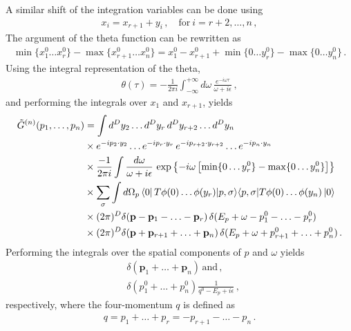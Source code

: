 \documentclass[notes]{subfiles}
\begin{document}
A similar shift of the integration variables can be done using
\begin{align}
  x_i = x_{r+1} + y_i\, , \quad \mathrm{for}\ i=r+2, \ldots, n\, ,
\end{align}
The argument of the theta function can be rewritten as
\begin{align}
  \min\{x_1^0 \ldots x_r^0\} - \max\{x_{r+1}^0 \ldots x_n^0\} = 
  x_1^0 -x_{r+1}^0 + \min\{0 \ldots y_r^0\} - \max\{0 \ldots y_n^0\}\, .
\end{align}
Using the integral representation of the theta,
\begin{align}
  \theta(\tau) = -\frac{1}{2\pi i} \int_{-\infty}^{+\infty} d\omega\,
  \frac{e^{-i\omega \tau}}{\omega + i\epsilon}\, ,
\end{align}
and performing the integrals over $x_1$ and $x_{r+1}$, yields
\begin{align}
  \tilde{G}^{(n)}(p_1, \ldots, p_n) 
  &= \int d^Dy_2 \ldots d^Dy_r\, d^Dy_{r+2} \ldots d^Dy_n \, \nonumber
  \\
  & \times e^{-ip_2\cdot y_2} \ldots e^{-ip_{r}\cdot y_r} 
    \, e^{-ip_{r+2}\cdot y_{r+2}} \ldots e^{-ip_{n}\cdot y_n}
    \nonumber \\
  & \times \frac{-1}{2\pi i} \int \frac{d\omega}{\omega + i\epsilon}\, 
    \exp\left\{
    -i \omega \left[ 
    \min\{0 \ldots y_r^0\} - \max\{0 \ldots y_n^0\}
    \right]
    \right\} \nonumber \\
  & \times \sum_\sigma \int d\Omega_p
    \bra{0}  T \phi(0) \ldots \phi(y_r) |
    p,\sigma\rangle \langle p, \sigma | T \phi(0) \ldots \phi(y_n)
    \ket{0} \nonumber \\
  & \times (2\pi)^D \delta(\mathbf{p} - \mathbf{p}_1 - \ldots -
    \mathbf{p}_r) \, 
    \delta(E_p + \omega - p_1^0 - \ldots - p_{r}^0) \nonumber \\
  & \times (2\pi)^D \delta(\mathbf{p} + \mathbf{p}_{r+1} + \ldots +
    \mathbf{p}_n) \, 
    \delta(E_p + \omega + p_{r+1}^0 + \ldots + p_{n}^0) \, .
\end{align}
Performing the integrals over the spatial components of $p$ and
$\omega$ yields
\begin{align}
  &\delta(\mathbf{p}_1+ \ldots +\mathbf{p}_n)\, \mathrm{and}\, , \nonumber \\
  & \delta(p_1^0 + \ldots + p_n^0) \frac{1}{q^0-E_p +i\epsilon}\, ,
\end{align}
respectively, where the four-momentum $q$ is defined as
\begin{align}
  q=p_1 + \ldots + p_r = -p_{r+1} - \ldots - p_n\, .
\end{align}
\end{document}
